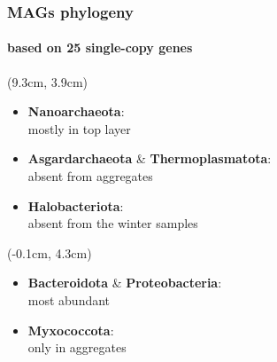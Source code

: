 \documentclass{beamer}
\begin{document}
\begin{frame}
\begin{textblock*}{6cm}
\begin{itemize}
         \end{itemize}
      \end{textblock*}

   \end{frame}

   \begin{frame}
      \frametitle{MAGs phylogeny}
      \framesubtitle{based on 25 single-copy genes }



      \begin{textblock*}{4cm}(9.3cm, 3.9cm)
         \scriptsize
         \begin{itemize}
            \item \textbf{Nanoarchaeota}: \\ mostly in top layer
            \item \textbf{Asgardarchaeota} \& \textbf{Thermoplasmatota}: \\ absent from aggregates
            \item \textbf{Halobacteriota}: \\ absent from the winter samples
         \end{itemize}
         
      \end{textblock*}

      \begin{textblock*}{4cm}(-0.1cm, 4.3cm)
         \scriptsize
         \begin{itemize}
            \item \textbf{Bacteroidota} \& \textbf{Proteobacteria}: \\ most abundant
            \item \textbf{Myxococcota}: \\ only in aggregates
         \end{itemize}
         

\end{textblock*}
\end{frame}
\end{document}

